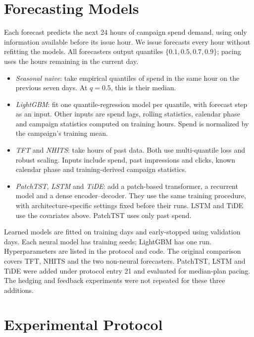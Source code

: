 \documentclass[sigconf,nonacm]{acmart}
\begin{document}
\section{Forecasting Models}

Each forecast predicts the next 24 hours of campaign spend demand, using only
information available before its issue hour. We issue forecasts every hour
without refitting the models. All forecasters output quantiles
$\{0.1,0.5,0.7,0.9\}$; pacing uses the hours remaining in the current day.
\begin{itemize}
  \item \emph{Seasonal naive}: take empirical quantiles of spend in the same
        hour on the previous seven days. At $q=0.5$, this is their median.
  \item \emph{LightGBM}: fit one quantile-regression model per quantile, with
        forecast step as an input. Other inputs are spend lags, rolling
        statistics, calendar phase and campaign statistics computed on training
        hours. Spend is normalized by the campaign's training mean.
  \item \emph{TFT} and \emph{NHITS}: take  hours of past
        data. Both use multi-quantile loss and robust scaling. Inputs include spend,
        past impressions and clicks, known calendar phase and training-derived
        campaign statistics.
  \item \emph{PatchTST}, \emph{LSTM} and \emph{TiDE}: add a patch-based
        transformer, a recurrent model and a dense encoder--decoder. They use
        the same training procedure, with architecture-specific settings fixed
        before their runs. LSTM and TiDE use the covariates above. PatchTST
        uses only past spend.
\end{itemize}
Learned models are fitted on training days and early-stopped using validation
days. Each neural model has  training seeds; LightGBM has one
run. Hyperparameters are listed in the protocol and code. The original
comparison covers TFT, NHITS and the two non-neural forecasters. PatchTST,
LSTM and TiDE were added under protocol entry 21 and evaluated for median-plan
pacing. The hedging and feedback experiments were not repeated for these
three additions.

\section{Experimental Protocol}
\end{document}
